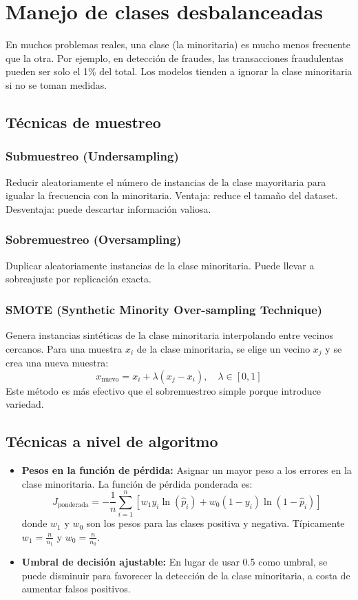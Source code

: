 \documentclass[12pt,a4paper,openany,oneside]{book}
\begin{document}
\section{Manejo de clases desbalanceadas}
En muchos problemas reales, una clase (la minoritaria) es mucho menos frecuente que la otra. Por ejemplo, en detección de fraudes, las transacciones fraudulentas pueden ser solo el 1\% del total. Los modelos tienden a ignorar la clase minoritaria si no se toman medidas.

\subsection{Técnicas de muestreo}

\subsubsection{Submuestreo (Undersampling)}
Reducir aleatoriamente el número de instancias de la clase mayoritaria para igualar la frecuencia con la minoritaria. Ventaja: reduce el tamaño del dataset. Desventaja: puede descartar información valiosa.

\subsubsection{Sobremuestreo (Oversampling)}
Duplicar aleatoriamente instancias de la clase minoritaria. Puede llevar a sobreajuste por replicación exacta.

\subsubsection{SMOTE (Synthetic Minority Over-sampling Technique)}
Genera instancias sintéticas de la clase minoritaria interpolando entre vecinos cercanos. Para una muestra \(x_i\) de la clase minoritaria, se elige un vecino \(x_j\) y se crea una nueva muestra:
\[
x_{\text{nuevo}} = x_i + \lambda (x_j - x_i), \quad \lambda \in [0,1]
\]
Este método es más efectivo que el sobremuestreo simple porque introduce variedad.

\subsection{Técnicas a nivel de algoritmo}
\begin{itemize}
    \item \textbf{Pesos en la función de pérdida:} Asignar un mayor peso a los errores en la clase minoritaria. La función de pérdida ponderada es:
    \[
    J_{\text{ponderada}} = -\frac{1}{n} \sum_{i=1}^n \left[ w_1 y_i \ln(\hat{p}_i) + w_0 (1 - y_i) \ln(1 - \hat{p}_i) \right]
    \]
    donde \(w_1\) y \(w_0\) son los pesos para las clases positiva y negativa. Típicamente \(w_1 = \frac{n}{n_1}\) y \(w_0 = \frac{n}{n_0}\).
    \item \textbf{Umbral de decisión ajustable:} En lugar de usar 0.5 como umbral, se puede disminuir para favorecer la detección de la clase minoritaria, a costa de aumentar falsos positivos.
\end{itemize}
\end{document}

